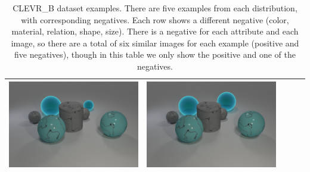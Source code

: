 \begin{table}
\begin{tabular}{@{}ccccc@{}}
\begin{minipage}{.2\textwidth}
      \includegraphics[width=\linewidth]{figures/clevr_datasets/CLEVRA_examples/test5.png}
    \end{minipage}
    &
        \begin{minipage}{.2\textwidth}
      \includegraphics[width=\linewidth]{figures/clevr_datasets/CLEVRA_examples/test_size5.png}
    \end{minipage}
\\ 

\bottomrule
\end{tabular}
\caption[CLEVR\_B dataset examples]{CLEVR\_B dataset examples. There are five examples from each distribution, with corresponding negatives. Each row shows a different negative (color, material, relation, shape, size). There is a negative for each attribute and each image, so there are a total of six similar images for each example (positive and five negatives), though in this table we only show the positive and one of the negatives.}
\end{table}